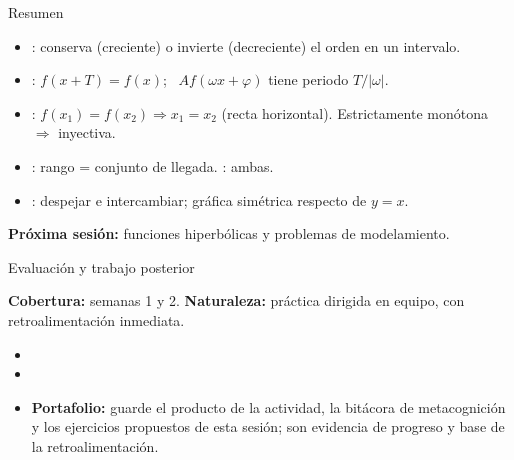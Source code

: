 \documentclass[10pt,aspectratio=169]{beamer}
\begin{document}
\begin{frame}{Resumen}
  \begin{itemize}
    \item {}: conserva (creciente) o invierte (decreciente) el orden en un intervalo.
    \item {}: $f(x+T)=f(x)$; \ $Af(\omega x+\varphi)$ tiene periodo $T/|\omega|$.
    \item {}: $f(x_1)=f(x_2)\Rightarrow x_1=x_2$ (recta horizontal). Estrictamente monótona $\Rightarrow$ inyectiva.
    \item {}: rango = conjunto de llegada. : ambas.
    \item {}: despejar e intercambiar; gráfica simétrica respecto de $y=x$.
  \end{itemize}
  \vspace{3mm}
  \textbf{Próxima sesión:} funciones hiperbólicas y problemas de modelamiento.
\end{frame}


\begin{frame}{Evaluación y trabajo posterior}
  \small
  \begin{evalbox}
    \textbf{Cobertura:} semanas 1 y 2. \textbf{Naturaleza:} práctica dirigida en equipo, con retroalimentación inmediata.
  \end{evalbox}
  \begin{itemize}
    \item \criterios
    \item \declaracionia
    \item \textbf{Portafolio:} guarde el producto de la actividad, la bitácora de metacognición y los ejercicios propuestos de esta sesión; son evidencia de progreso y base de la retroalimentación.
  \end{itemize}
\end{frame}
\end{document}
